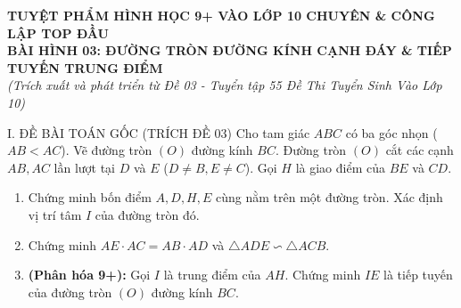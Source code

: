 \documentclass[11pt,a4paper]{article}
\begin{document}
\begin{center}
    {\Large\bfseries\color{blue!80!black} TUYỆT PHẨM HÌNH HỌC 9+ VÀO LỚP 10 CHUYÊN \& CÔNG LẬP TOP ĐẦU}\\[2mm]
    {\large\bfseries BÀI HÌNH 03: ĐƯỜNG TRÒN ĐƯỜNG KÍNH CẠNH ĐÁY \& TIẾP TUYẾN TRUNG ĐIỂM}\\[1mm]
    \textit{(Trích xuất và phát triển từ Đề 03 - Tuyển tập 55 Đề Thi Tuyển Sinh Vào Lớp 10)}
\end{center}

\vspace{1mm}

\begin{modelbox}{I. ĐỀ BÀI TOÁN GỐC (TRÍCH ĐỀ 03)}
Cho tam giác $ABC$ có ba góc nhọn ($AB < AC$). Vẽ đường tròn $(O)$ đường kính $BC$. Đường tròn $(O)$ cắt các cạnh $AB, AC$ lần lượt tại $D$ và $E$ ($D \ne B, E \ne C$). Gọi $H$ là giao điểm của $BE$ và $CD$.
\begin{enumerate}[label=\textbf{\alph*)}]
    \item Chứng minh bốn điểm $A, D, H, E$ cùng nằm trên một đường tròn. Xác định vị trí tâm $I$ của đường tròn đó.
    \item Chứng minh $AE \cdot AC = AB \cdot AD$ và $\triangle ADE \backsim \triangle ACB$.
    \item \textbf{(Phân hóa 9+):} Gọi $I$ là trung điểm của $AH$. Chứng minh $IE$ là tiếp tuyến của đường tròn $(O)$ đường kính $BC$.
\end{enumerate}
\end{modelbox}

\vspace{1mm}
\end{document}
